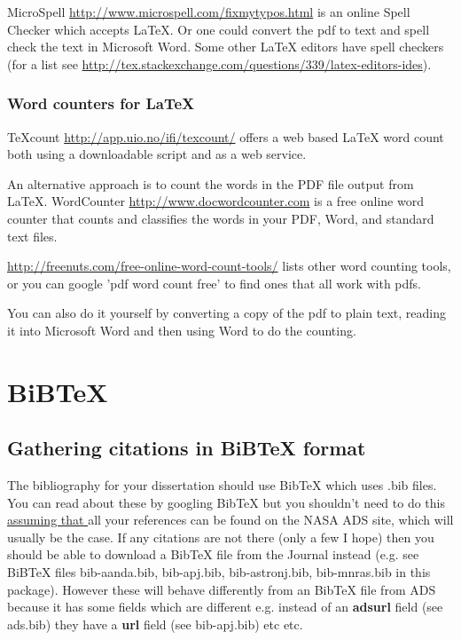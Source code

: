 \documentclass[twoside,fontsize=12pt,
     bibliography=totoc, %
     listof=totoc, %
     index=totoc, %
     onehalfspacing %
]{_MScDiss2017_cls}
\begin{document}
MicroSpell \url{http://www.microspell.com/fixmytypos.html}  is an online Spell Checker which accepts LaTeX.
Or one could convert the pdf to text and spell check the text in Microsoft Word. Some other LaTeX editors have spell checkers (for a list see 
\url{http://tex.stackexchange.com/questions/339/latex-editors-ides}). 

\subsection{Word counters for LaTeX}\label{sec:count}
TeXcount \url{http://app.uio.no/ifi/texcount/} offers a web based LaTeX word count both using a downloadable script and as a web service.

An alternative approach is to count the words in the PDF file output from LaTeX.
WordCounter \url{http://www.docwordcounter.com} is a free online word counter that counts and classifies the words in your PDF, Word, and standard text files.

\url{http://freenuts.com/free-online-word-count-tools/} lists other word counting tools, or you can google 'pdf word count free' to find ones that all work with pdfs. 

You can also do it yourself by converting a copy of the pdf to plain text, reading it into Microsoft Word and then using Word to do the counting.

\chapter{BiBTeX}
\label{chap:bibtex}
\section{Gathering citations in BiBTeX format}
\label{sec:gather}
The bibliography for your  dissertation should use BibTeX which uses .bib files. You can read about these by googling BibTeX but you shouldn't need to do this  \underline{assuming that }all your references can be found on the NASA ADS site, which will usually be the case. If any  citations are not there (only a few I hope) then you should be able to download a BibTeX file from the Journal instead (e.g. see BiBTeX files bib-aanda.bib,  bib-apj.bib, bib-astronj.bib, bib-mnras.bib in this package). However these will behave differently from an  BibTeX file from ADS because it has some fields which are different e.g. instead of an  {\bf adsurl} field (see ads.bib) they have a {\bf url} field (see bib-apj.bib)  etc etc.
\end{document}
